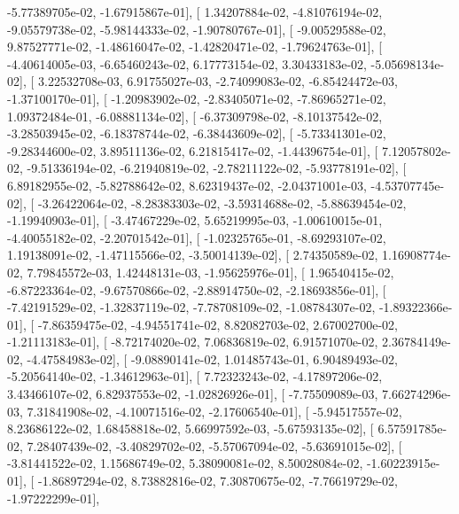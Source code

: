\documentclass{article}
\begin{document}
         -5.77389705e-02,  -1.67915867e-01],
       [  1.34207884e-02,  -4.81076194e-02,  -9.05579738e-02,
         -5.98144333e-02,  -1.90780767e-01],
       [ -9.00529588e-02,   9.87527771e-02,  -1.48616047e-02,
         -1.42820471e-02,  -1.79624763e-01],
       [ -4.40614005e-03,  -6.65460243e-02,   6.17773154e-02,
          3.30433183e-02,  -5.05698134e-02],
       [  3.22532708e-03,   6.91755027e-03,  -2.74099083e-02,
         -6.85424472e-03,  -1.37100170e-01],
       [ -1.20983902e-02,  -2.83405071e-02,  -7.86965271e-02,
          1.09372484e-01,  -6.08881134e-02],
       [ -6.37309798e-02,  -8.10137542e-02,  -3.28503945e-02,
         -6.18378744e-02,  -6.38443609e-02],
       [ -5.73341301e-02,  -9.28344600e-02,   3.89511136e-02,
          6.21815417e-02,  -1.44396754e-01],
       [  7.12057802e-02,  -9.51336194e-02,  -6.21940819e-02,
         -2.78211122e-02,  -5.93778191e-02],
       [  6.89182955e-02,  -5.82788642e-02,   8.62319437e-02,
         -2.04371001e-03,  -4.53707745e-02],
       [ -3.26422064e-02,  -8.28383303e-02,  -3.59314688e-02,
         -5.88639454e-02,  -1.19940903e-01],
       [ -3.47467229e-02,   5.65219995e-03,  -1.00610015e-01,
         -4.40055182e-02,  -2.20701542e-01],
       [ -1.02325765e-01,  -8.69293107e-02,   1.19138091e-02,
         -1.47115566e-02,  -3.50014139e-02],
       [  2.74350589e-02,   1.16908774e-02,   7.79845572e-03,
          1.42448131e-03,  -1.95625976e-01],
       [  1.96540415e-02,  -6.87223364e-02,  -9.67570866e-02,
         -2.88914750e-02,  -2.18693856e-01],
       [ -7.42191529e-02,  -1.32837119e-02,  -7.78708109e-02,
         -1.08784307e-02,  -1.89322366e-01],
       [ -7.86359475e-02,  -4.94551741e-02,   8.82082703e-02,
          2.67002700e-02,  -1.21113183e-01],
       [ -8.72174020e-02,   7.06836819e-02,   6.91571070e-02,
          2.36784149e-02,  -4.47584983e-02],
       [ -9.08890141e-02,   1.01485743e-01,   6.90489493e-02,
         -5.20564140e-02,  -1.34612963e-01],
       [  7.72323243e-02,  -4.17897206e-02,   3.43466107e-02,
          6.82937553e-02,  -1.02826926e-01],
       [ -7.75509089e-03,   7.66274296e-03,   7.31841908e-02,
         -4.10071516e-02,  -2.17606540e-01],
       [ -5.94517557e-02,   8.23686122e-02,   1.68458818e-02,
          5.66997592e-03,  -5.67593135e-02],
       [  6.57591785e-02,   7.28407439e-02,  -3.40829702e-02,
         -5.57067094e-02,  -5.63691015e-02],
       [ -3.81441522e-02,   1.15686749e-02,   5.38090081e-02,
          8.50028084e-02,  -1.60223915e-01],
       [ -1.86897294e-02,   8.73882816e-02,   7.30870675e-02,
         -7.76619729e-02,  -1.97222299e-01],
\end{document}
